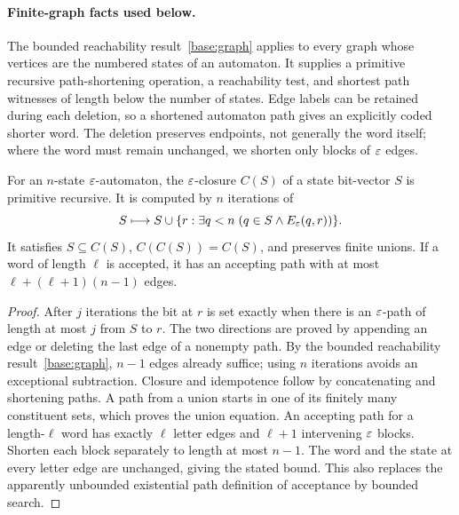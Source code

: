 \paragraph{Finite-graph facts used below.}
The bounded reachability result~\ref{base:graph} applies to every graph
whose vertices are the numbered states of an automaton.  It supplies a
primitive recursive path-shortening operation, a reachability test, and
shortest path witnesses of length below the number of states.  Edge
labels can be retained during each deletion, so a shortened automaton
path gives an explicitly coded shorter word.  The deletion preserves
endpoints, not generally the word itself; where the word must remain
unchanged, we shorten only blocks of $\varepsilon$ edges.

\begin{proposition}\label{reg:epsilon}
For an $n$-state $\varepsilon$-automaton, the $\varepsilon$-closure $C(S)$ of a state
bit-vector $S$ is primitive recursive.  It is computed by $n$ iterations of
\[
 S\longmapsto S\cup\{r:\exists q<n\;(q\in S\wedge E_\varepsilon(q,r))\}.
\]
It satisfies $S\subseteq C(S)$, $C(C(S))=C(S)$, and preserves finite unions.
If a word of length $\ell$ is accepted, it has an accepting path with at most
$\ell+(\ell+1)(n-1)$ edges.
\end{proposition}
\begin{proof}
After $j$ iterations the bit at $r$ is set exactly when there is an
$\varepsilon$-path of length at most $j$ from $S$ to $r$.  The two directions are
proved by appending an edge or deleting the last edge of a nonempty path.
By the bounded reachability result~\ref{base:graph}, $n-1$ edges already suffice; using $n$ iterations
avoids an exceptional subtraction.  Closure and idempotence follow by
concatenating and shortening paths.  A path from a union starts in one of
its finitely many constituent sets, which proves the union equation.
An accepting path for a length-$\ell$ word has exactly $\ell$ letter edges
and $\ell+1$ intervening $\varepsilon$ blocks.  Shorten each block separately to
length at most $n-1$.  The word and the state at every letter edge are
unchanged, giving the stated bound.  This also replaces the apparently
unbounded existential path definition of acceptance by bounded search.
\end{proof}


